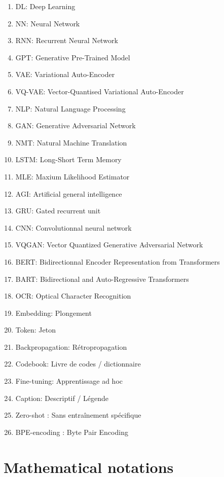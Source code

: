\documentclass{article}
\begin{document}
\begin{enumerate}
    \item DL: Deep Learning 
    \item NN: Neural Network 
    \item RNN: Recurrent Neural Network 
    \item GPT: Generative Pre-Trained Model
    \item VAE: Variational Auto-Encoder 
    \item VQ-VAE: Vector-Quantised Variational Auto-Encoder
    \item NLP: Natural Language Processing
    \item GAN: Generative Adversarial Network
    \item NMT: Natural Machine Translation
    \item LSTM: Long-Short Term Memory
    \item MLE: Maxium Likelihood Estimator
    \item AGI: Artificial general intelligence
    \item GRU: Gated recurrent unit
    \item CNN: Convolutionnal neural network
    \item VQGAN: Vector Quantized Generative Adversarial Network
    \item BERT: Bidirectionnal Encoder Representation from Transformers
    \item BART: Bidirectional and Auto-Regressive Transformers
    \item  OCR: Optical Character Recognition \newline

    \item Embedding: Plongement
    \item Token: Jeton
    \item Backpropagation: Rétropropagation
    \item Codebook: Livre de codes / dictionnaire
    \item Fine-tuning: Apprentissage ad hoc
    \item Caption: Descriptif / Légende
    \item Zero-shot : Sans entraînement spécifique
    \item BPE-encoding : Byte Pair Encoding

\end{enumerate}

\pagebreak
{}
{}
\section*{Mathematical notations}
\end{document}
